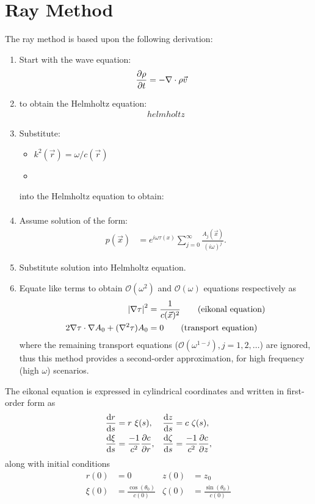 \chapter{Ray Method}
The ray method is based upon the following derivation:
\begin{enumerate}
	\item Start with the wave equation:
	\begin{align}
		\pdv{\rho}{t} &= -\nabla \cdot \rho \vec{v}
	\end{align}

	\item  to obtain the Helmholtz equation:
	\begin{align}
		helmholtz
	\end{align}

	\item Substitute:
	\begin{itemize}
		\item $k^2(\vec{r}) = \omega / c(\vec{r})$
		\item 
	\end{itemize}
	into the Helmholtz equation to obtain:
	\begin{align}
		\tag{TODO}
	\end{align}

	\item Assume solution of the form:
	\begin{align}
		p(\vec{x}) &= e^{i\omega\tau(x)} \sum_{j=0}^\infty \frac{A_j(\vec{x})}{(i\omega)^j}.
	\end{align}

	\item Substitute solution into Helmholtz equation.

	\item Equate like terms to obtain $\mathcal{O}(\omega^2)$ and $\mathcal{O}(\omega)$ equations respectively as
	\begin{align}
		{ \left| {\nabla\tau} \right| }^2 &= \frac{1}{c(\vec{x})^2} \tag{eikonal equation} \\
		2\nabla\tau \cdot \nabla{A_0} + (\nabla^2\tau) A_0 &= 0 \tag{transport equation}
	\end{align}
	where the remaining transport equations ($\mathcal{O}(\omega^{1-j}), j = 1, 2, \dots$) are ignored, thus this method provides a second-order approximation, for high frequency (high $\omega$) scenarios.
\end{enumerate}

The eikonal equation is expressed in cylindrical coordinates and written in first-order form as
\begin{align}
	\dv{r}{s} &= r\ \xi(s), &
	\dv{z}{s} &= c\ \zeta(s), \\
	\dv{\xi}{s} &= \frac{-1}{c^2} \pdv{c}{r}, &
	\dv{\zeta}{s} &= \frac{-1}{c^2} \pdv{c}{z},
\end{align}
along with initial conditions
\begin{align}
	r(0) &= 0 &
	z(0) &= z_0 \\
	\xi(0) &= \frac{\cos(\theta_0)}{c(0)} &
	\zeta(0) &= \frac{\sin(\theta_0)}{c(0)}
\end{align}

